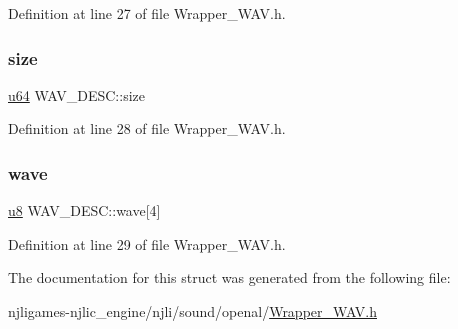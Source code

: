 Definition at line 27 of file Wrapper\+\_\+\+W\+A\+V.\+h.

\mbox{\label{struct_w_a_v___d_e_s_c_ae6ad2ec7f877cb64c6b89961e209bdde}} 
\subsubsection{\texorpdfstring{size}{size}}
{\footnotesize\ttfamily \mbox{\hyperlink{_util_8h_ad758b7a5c3f18ed79d2fcd23d9f16357}{u64}} W\+A\+V\+\_\+\+D\+E\+S\+C\+::size}



Definition at line 28 of file Wrapper\+\_\+\+W\+A\+V.\+h.

\mbox{\label{struct_w_a_v___d_e_s_c_aba4d38d3f00975867e3f36d3d11ca8b9}} 
\subsubsection{\texorpdfstring{wave}{wave}}
{\footnotesize\ttfamily \mbox{\hyperlink{_util_8h_aed742c436da53c1080638ce6ef7d13de}{u8}} W\+A\+V\+\_\+\+D\+E\+S\+C\+::wave\mbox{[}4\mbox{]}}



Definition at line 29 of file Wrapper\+\_\+\+W\+A\+V.\+h.



The documentation for this struct was generated from the following file\+:\begin{DoxyCompactItemize}
\item 
njligames-\/njlic\+\_\+engine/njli/sound/openal/\mbox{\hyperlink{_wrapper___w_a_v_8h}{Wrapper\+\_\+\+W\+A\+V.\+h}}\end{DoxyCompactItemize}
